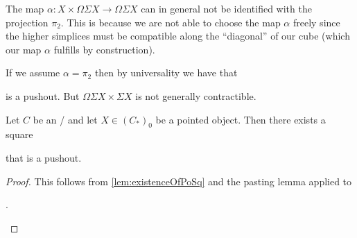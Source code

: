 \begin{remark}\label{rmk:mapNotProj}
    The map $\alpha\colon X\times\Omega\Sigma X\to\Omega\Sigma X$ can in general not be identified with the projection $\pi_2$.
    This is because we are not able to choose the map $\alpha$ freely since the higher simplices must be compatible along the ``diagonal'' of our cube (which our map $\alpha$ fulfills by construction).

    If we assume $\alpha=\pi_2$ then by universality we have that 
    \begin{center}
    \end{center}
    is a pushout.
    But $\Omega\Sigma X\times \Sigma X$ is not generally contractible. 
\end{remark}
\begin{corollary}\label{lem:poOfProductIsSuspension}
    Let $C$ be an \inftytop/ and let $X\in \left(C_*\right)_0$ be a pointed object. 
    Then there exists a square
    \begin{center}
    \end{center}
    that is a pushout.
    \begin{proof}
        This follows from \cref{lem:existenceOfPoSq} and the pasting lemma applied to 
        \begin{center}
            \;.
        \end{center}
    \end{proof}
\end{corollary}
